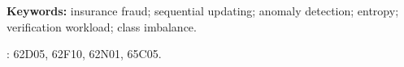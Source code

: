 \noindent\textbf{Keywords:} insurance fraud; sequential updating; anomaly
detection; entropy; verification workload; class imbalance.
\par{}: {62D05, 62F10, 62N01, 65C05.}



\begin{revised}


\end{revised}



